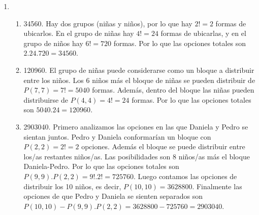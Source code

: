\documentclass[a4paper]{article}
\newcommand{\exercise}{\item}
\begin{document}
\begin{enumerate}
\begin{enumerate} [label=(\alph*)]
		\item 715. Se seleccionan 4 personas de las 13, es decir, $\binom{13}{4}=715$ opciones.
		\item 365. Hay varios casos posibles: 2 mujeres en la comisión (con $\binom{5}{2}.\binom{8}{2}=10.28=280$ opciones), 3 mujeres en la comisión (con $\binom{5}{3}.\binom{8}{1}=10.8=80$ opciones), o 4 mujeres en la comisión (con $\binom{5}{4}=5$ opciones). El total de opciones es $280+80+5=365$.
		\item 1196. Hay varios casos posibles: 1 oficial en el grupo (con $\binom{4}{1}.\binom{8}{5}=4.56=224$ opciones), 2 oficiales en el grupo (con $\binom{4}{2}.\binom{8}{4}=6.70=420$ opciones), 3 oficiales en el grupo (con $\binom{4}{3}.\binom{8}{3}=4.56=224$ opciones), o 4 oficiales en el grupo (con $\binom{4}{4}.\binom{8}{2}=1.28=28$ opciones). El total de opciones es $224+720+224+28=1196$. %
		\item $\binom{15}{5}~7^{10}$. Primero ubicamos 5 bolillas en el casillero 4, es decir $\binom{15}{5}$. Luego, ubicamos las 10 bolillas restantes en los 7 casilleros restantes. Pero en vez de pensar que repartimos bolilla en los casilleros, pensaremos que repartimos casilleros en bolillas. De esta manera, los casilleros se pueden repetir en las 10 bolillas y el número será $P^r(7,10)=7^{10}$. El número total de posibilidades es $\binom{15}{5}.7^{10}$.
\item ---\end{enumerate}\exercise\begin{enumerate} [label=(\alph*)]		\item 34560. Hay dos grupos (niñas y niños), por lo que hay $2!=2$ formas de ubicarlos. En el grupo de niñas hay $4!=24$ formas de ubicarlas, y en el grupo de niños hay $6!=720$ formas. Por lo que las opciones totales son $2.24.720=34560$.
		\item 120960. El grupo de niñas puede considerarse como un bloque a distribuir entre los niños. Los 6 niños más el bloque de niñas se pueden distribuir de $P(7,7)=7!=5040$ formas. Además, dentro del bloque las niñas pueden distribuirse de $P(4,4)=4!=24$ formas. Por lo que las opciones totales son $5040.24=120960$.
		\item 2903040. Primero analizamos las opciones en las que Daniela y Pedro se sientan juntos. Pedro y Daniela conformarían un bloque con $P(2,2)=2!=2$ opciones. Además el bloque se puede distribuir entre los/as restantes niños/as. Las posibilidades son 8 niños/as más el bloque Daniela-Pedro. Por lo que las opciones totales son $P(9,9).P(2,2)=9!.2!=725760$. Luego contamos las opciones de distribuir los 10 niños, es decir, $P(10,10)=3628800$. Finalmente las opciones de que Pedro y Daniela se sienten separados son $P(10,10)-P(9,9).P(2,2)=3628800-725760=2903040$.

\end{enumerate}
\end{enumerate}
\end{document}
